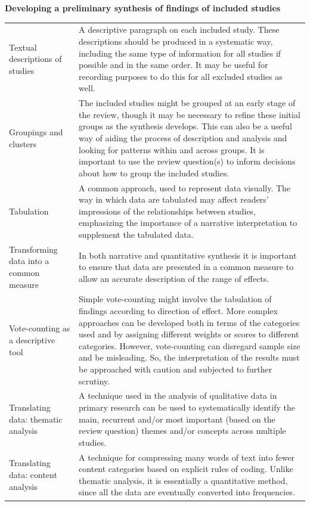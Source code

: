\documentclass[
  11pt,
  a4paper,
  DIV=11,
  numbers=noendperiod]{scrreprt}
\begin{document}
\textbf{Developing a preliminary synthesis of findings of included
studies}

\begin{longtable}[]{@{}
  >{\raggedright\arraybackslash}p{}
  >{\raggedright\arraybackslash}p{}@{}}
\toprule\noalign{}
\endhead
\bottomrule\noalign{}
\endlastfoot
Textual descriptions of studies & A descriptive paragraph on each
included study. These descriptions should be produced in a systematic
way, including the same type of information for all studies if possible
and in the same order. It may be useful for recording purposes to do
this for all excluded studies as well. \\
Groupings and clusters & The included studies might be grouped at an
early stage of the review, though it may be necessary to refine these
initial groups as the synthesis develops. This can also be a useful way
of aiding the process of description and analysis and looking for
patterns within and across groups. It is important to use the review
question(s) to inform decisions about how to group the included
studies. \\
Tabulation & A common approach, used to represent data visually. The way
in which data are tabulated may affect readers' impressions of the
relationships between studies, emphasizing the importance of a narrative
interpretation to supplement the tabulated data. \\
Transforming data into a common measure & In both narrative and
quantitative synthesis it is important to ensure that data are presented
in a common measure to allow an accurate description of the range of
effects. \\
Vote-counting as a descriptive tool & Simple vote-counting might involve
the tabulation of findings according to direction of effect. More
complex approaches can be developed both in terms of the categories used
and by assigning different weights or scores to different categories.
However, vote-counting can disregard sample size and be misleading. So,
the interpretation of the results must be approached with caution and
subjected to further scrutiny. \\
Translating data: thematic analysis & A technique used in the analysis
of qualitative data in primary research can be used to systematically
identify the main, recurrent and/or most important (based on the review
question) themes and/or concepts across multiple studies. \\
Translating data: content analysis & A technique for compressing many
words of text into fewer content categories based on explicit rules of
coding. Unlike thematic analysis, it is essentially a quantitative
method, since all the data are eventually converted into frequencies. \\
\end{longtable}
\end{document}
